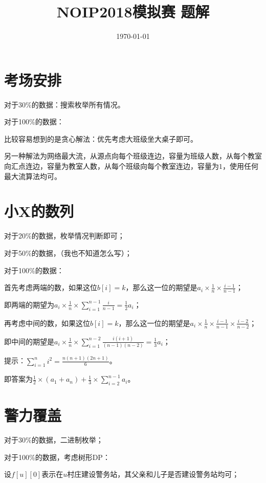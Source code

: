 \documentclass{article}
\title{NOIP2018模拟赛 题解}
\date{\today}
\begin{document}
	\maketitle

	\section{考场安排}
    
    对于30\%的数据：搜索枚举所有情况。

    对于100\%的数据：
    
    比较容易想到的是贪心解法：优先考虑大班级坐大桌子即可。

    另一种解法为网络最大流，从源点向每个班级连边，容量为班级人数，从每个教室向汇点连边，容量为教室人数，从每个班级向每个教室连边，容量为\(1\)，使用任何最大流算法均可。

	\section{小X的数列}
    
    对于20\%的数据，枚举情况判断即可；

    对于50\%的数据，（我也不知道怎么写）；

    对于100\%的数据：

    首先考虑两端的数，如果这位\(b[i]=k\)，那么这一位的期望是\(a_i\times \frac 1n\times \frac {i-1}{n-1}\)；

    即两端的期望为\(a_i\times \frac 1n\times \sum_{i=1}^{n-1} \frac i{n-1}=\frac 12 a_i\)；

    再考虑中间的数，如果这位\(b[i]=k\)，那么这一位的期望是\(a_i\times \frac 1n\times \frac {i-1}{n-1}\times \frac {i-2}{n-2}\)；

    即中间的期望是\(a_i\times \frac 1n\times \sum_{i=1}^{n-2} \frac {i(i+1)}{(n-1)(n-2)}=\frac 13 a_i\)；

    提示：\(\sum_{i=1}^n i^2=\frac {n(n+1)(2n+1)}6\)。

    即答案为\(\frac 12\times (a_1+a_n)+\frac 13\times \sum_{i=2}^{n-1} a_i\)。
    
	\section{警力覆盖}
    
	对于30\%的数据，二进制枚举；

    对于100\%的数据，考虑树形DP：

    设\(f[u][0]\)表示在\(u\)村庄建设警务站，其父亲和儿子是否建设警务站均可；
\end{document}
